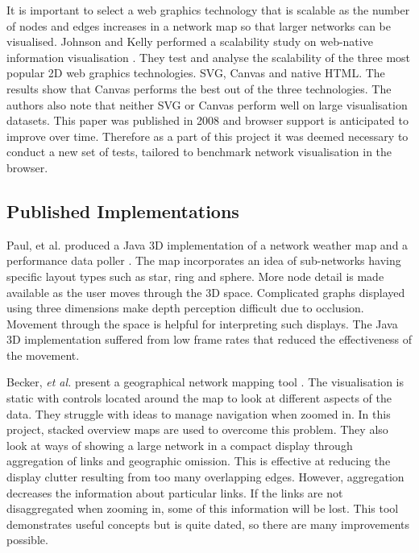 \documentclass[11pt, a4paper]{report}
\begin{document}
It is important to select a web graphics technology that is scalable as the
number of nodes and edges increases in a network map so that larger networks can
be visualised. Johnson and Kelly performed a scalability study on web-native
information visualisation \cite{Johnson_2008}.  They test and analyse the
scalability of the three most popular 2D web graphics technologies.  SVG, Canvas
and native HTML. The results show that Canvas performs the best out of the three
technologies. The authors also note that neither SVG or Canvas perform well on
large visualisation datasets. This paper was published in 2008 and browser
support is anticipated to improve over time. Therefore as a part of this project
it was deemed necessary to conduct a new set of tests, tailored to benchmark
network visualisation in the browser.



\subsection{Published Implementations}
\label{sec:published-implementations}

Paul, et al. produced a Java 3D implementation of a network weather map and a
performance data poller \cite{Paul_2000}. The map incorporates an idea of
sub-networks having specific layout types such as star, ring and sphere. More
node detail is made available as the user moves through the 3D space.
Complicated graphs displayed using three dimensions make depth perception
difficult due to occlusion. Movement through the space is helpful for
interpreting such displays. The Java 3D implementation suffered from low frame
rates that reduced the effectiveness of the movement.


Becker, \emph{et al.} present a geographical network mapping tool \cite{Becker_1995}.
The visualisation is static with controls located around the map to look at
different aspects of the data. They struggle with ideas to manage navigation
when zoomed in. In this project, stacked overview maps are used to overcome this
problem. They also look at ways of showing a large network in a compact display
through aggregation of links and geographic omission. This is effective at
reducing the display clutter resulting from too many overlapping edges. However,
aggregation decreases the information about particular links. If the links are
not disaggregated when zooming in, some of this information will be lost. This
tool demonstrates useful concepts but is quite dated, so there are many
improvements possible.
\end{document}
